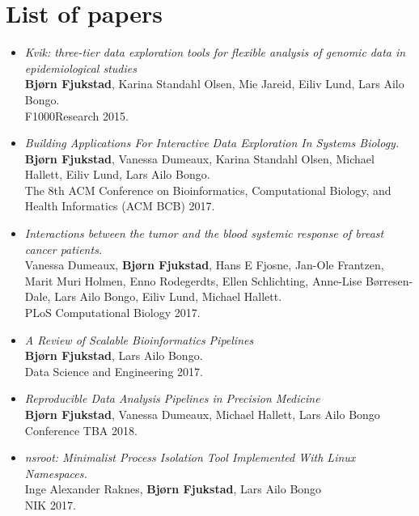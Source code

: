 \section{List of papers} 
\begin{itemize}
    \item
        \emph{Kvik: three-tier data exploration tools for flexible analysis of
        genomic data in epidemiological studies}
        \\
        \textbf{Bjørn Fjukstad}, Karina Standahl Olsen, Mie Jareid, Eiliv Lund,
        Lars Ailo Bongo. 
        \\ 
        F1000Research 2015.
        
    \item 
        \emph{Building Applications For Interactive Data Exploration In Systems
        Biology.}
        \\
        \textbf{Bjørn Fjukstad}, Vanessa Dumeaux, Karina Standahl Olsen, Michael
        Hallett, Eiliv Lund, Lars Ailo Bongo.  
        \\ 
        The 8th ACM Conference on Bioinformatics, Computational Biology, and
        Health Informatics (ACM BCB) 2017.

    \item 
        \emph{Interactions between the tumor and the blood systemic response of
        breast cancer patients.}
        \\ 
        Vanessa Dumeaux, \textbf{Bjørn Fjukstad}, Hans E Fjosne, Jan-Ole
        Frantzen, Marit Muri Holmen, Enno Rodegerdts, Ellen Schlichting,
        Anne-Lise Børresen-Dale, Lars Ailo Bongo, Eiliv Lund, Michael Hallett.
        \\ 
        PLoS Computational Biology 2017.

    \item \emph{A Review of Scalable Bioinformatics Pipelines} 
        \\
        \textbf{Bjørn Fjukstad}, Lars Ailo Bongo.
        \\ 
        Data Science and Engineering 2017.

    \item \emph{Reproducible Data Analysis Pipelines in Precision Medicine}
        \\
        \textbf{Bjørn Fjukstad}, Vanessa Dumeaux, Michael Hallett, Lars Ailo
        Bongo
        \\
        Conference TBA 2018. 


    \item \emph{nsroot: Minimalist Process Isolation Tool Implemented With Linux
        Namespaces.}
        \\
        Inge Alexander Raknes, \textbf{Bjørn Fjukstad}, Lars Ailo Bongo 
        \\
        NIK 2017. 
        
\end{itemize} 



